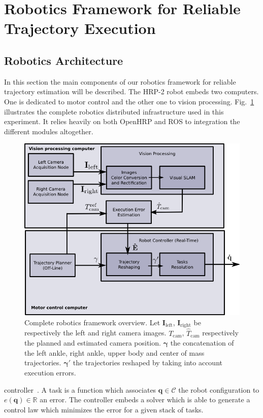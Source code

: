 \section{Robotics Framework for Reliable Trajectory Execution}\label{sec:architecture}

\subsection{Robotics Architecture}

In this section the main components of our robotics framework for
reliable trajectory estimation will be described. The HRP-2 robot
embeds two computers. One is dedicated to motor control and the other
one to vision processing. Fig.~\ref{fig:framework_overview}
illustrates the complete robotics distributed infrastructure used in
this experiment. It relies heavily on both OpenHRP and ROS to
integration the different modules altogether.
%
\begin{figure}[ht!]
  \begin{center}
    \includegraphics[width=\linewidth]{images/rss_framework.png}
  \end{center}
  \caption{Complete robotics framework overview. Let
    $\mathbf{I}_{\text{left}}$, $\mathbf{I}_{\text{right}}$ be
    respectively the left and right camera
    images. $\mathit{T}_{\text{cam}}$, $\mathit{\hat{T}}_{\text{cam}}$
    respectively the planned and estimated camera
    position. $\mathbf{\gamma}$ the concatenation of the left ankle,
    right ankle, upper body and center of mass
    trajectories. $\mathbf{\gamma'}$ the trajectories reshaped by
    taking into account execution
    errors.\label{fig:framework_overview}}
\end{figure}
controller~\cite{Mansard09icar}. A task is a function which associates
\mbox{$\mathbf{q} \in \mathcal{C}$} the robot configuration to
\mbox{$e(\mathbf{q}) \in \mathbb{R}$} an error. The controller embeds
a solver which is able to generate a control law which minimizes the
error for a given stack of tasks.

